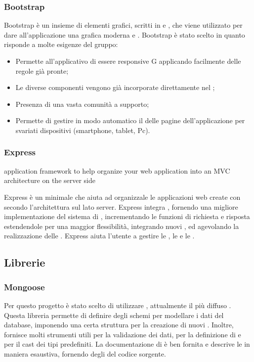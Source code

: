 \documentclass[12pt,a4paper]{article}
\begin{document}
\subsubsection{Bootstrap}\label{bootsrap}
Bootstrap è un insieme di elementi grafici, scritti in  e , che viene utilizzato per dare all'applicazione una grafica moderna e .
Bootstrap è stato scelto in quanto risponde a molte esigenze del gruppo:
\begin{itemize}
	\item Permette all’applicativo di essere responsive G applicando facilmente delle regole già pronte;
	\item Le diverse componenti vengono già incorporate direttamente nel  ;
	\item Presenza di una vasta comunità a supporto;
	\item Permette di gestire in modo automatico il  delle pagine dell'applicazione per svariati dispositivi (smartphone, tablet, Pc).
\end{itemize}


\subsubsection{Express}
application framework to help organize your web application into an MVC architecture on the server side

Express è un  minimale che aiuta ad organizzale le applicazioni web create con  secondo l'architettura  sul lato server. Express integra , fornendo una migliore implementazione del sistema di , incrementando le funzioni di richiesta e risposta estendendole per una maggior flessibilità, integrando nuovi , ed agevolando la realizzazione delle .
Express aiuta l'utente a gestire le , le  e le .


\subsection{Librerie}\label{librery}
\subsubsection{Mongoose}\label{mongoose}
Per questo progetto è stato scelto di utilizzare , attualmente il più diffuso . Questa libreria permette di definire degli schemi per modellare i dati del database, imponendo una certa struttura per la creazione di nuovi . Inoltre, fornisce molti strumenti utili per la validazione dei dati, per la definizione di  e per il cast dei tipi predefiniti.
La documentazione di  è ben fornita e descrive le  in maniera esaustiva, fornendo degli  del codice sorgente.
\end{document}
